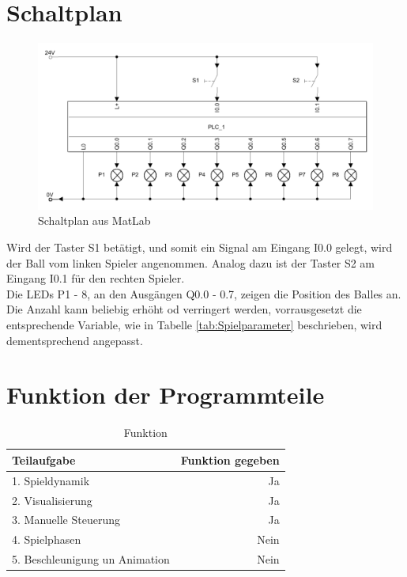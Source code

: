 \documentclass[a4paper]{article}
\begin{document}
    \section{Schaltplan}    %
    
     \begin{figure}[H]
         \includegraphics[width=\linewidth]{Image/Schaltplan.PNG}
         \caption{Schaltplan aus MatLab}
     \end{figure}

     Wird der Taster S1 betätigt, und somit ein Signal am Eingang I0.0 gelegt, wird der Ball vom linken Spieler angenommen. Analog dazu ist der Taster S2 am Eingang I0.1 für den rechten Spieler.\\
     Die LEDs P1 - 8, an den Ausgängen Q0.0 - 0.7, zeigen die Position des Balles an. Die Anzahl kann beliebig erhöht od verringert werden, vorrausgesetzt die entsprechende Variable, wie in Tabelle \ref{tab:Spielparameter} beschrieben, wird dementsprechend angepasst. 

    \section{Funktion der Programmteile} %
    \begin{table}[h!]
        \begin{center}
          \begin{tabular}{|l|r|}
         \hline 
            \textbf{Teilaufgabe} & \textbf{Funktion gegeben}\\
            \hline
            1. Spieldynamik & Ja\\
            \hline
            2. Visualisierung & Ja\\
            \hline
            3. Manuelle Steuerung & Ja\\
            \hline
            4. Spielphasen & Nein\\
            \hline
            5. Beschleunigung un Animation & Nein\\
            \hline
          \end{tabular}
          \caption{Funktion}
          \label{tab:Funktion}
        \end{center}
      \end{table}
\end{document}
